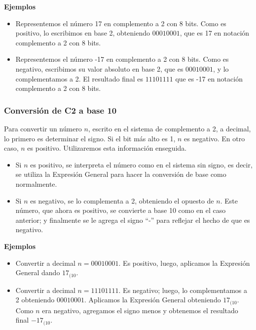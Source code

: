 \documentclass[spanish,A4,]{article}
\begin{document}
\textbf{Ejemplos}

\begin{itemize}
\itemsep1pt\parskip0pt
\item
  Representemos el número 17 en complemento a 2 con 8 bits. Como es
  positivo, lo escribimos en base 2, obteniendo $00010001$, que es 17 en
  notación complemento a 2 con 8 bits.
\item
  Representemos el número -17 en complemento a 2 con 8 bits. Como es
  negativo, escribimos su valor absoluto en base 2, que es $00010001$, y
  lo complementamos a 2. El resultado final es $11101111$ que es -17 en
  notación complemento a 2 con 8 bits.
\end{itemize}

\subsubsection{Conversión de C2 a base
10}\label{conversiuxf3n-de-c2-a-base-10}

Para convertir un número $n$, escrito en el sistema de complemento a 2,
a decimal, lo primero es determinar el signo. Si el bit más alto es 1,
$n$ es negativo. En otro caso, $n$ es positivo. Utilizaremos esta
información enseguida.

\begin{itemize}
\itemsep1pt\parskip0pt
\item
  Si $n$ es positivo, se interpreta el número como en el sistema sin
  signo, es decir, se utiliza la Expresión General para hacer la
  conversión de base como normalmente.
\item
  Si $n$ es negativo, se lo complementa a 2, obteniendo el opuesto de
  $n$. Este número, que ahora es positivo, se convierte a base 10 como
  en el caso anterior; y finalmente se le agrega el signo ``-'' para
  reflejar el hecho de que es negativo.
\end{itemize}

\textbf{Ejemplos}

\begin{itemize}
\itemsep1pt\parskip0pt
\item
  Convertir a decimal $n = 00010001$. Es positivo, luego, aplicamos la
  Expresión General dando $17_{(10}$.
\item
  Convertir a decimal $n = 11101111$. Es negativo; luego, lo
  complementamos a 2 obteniendo $00010001$. Aplicamos la Expresión
  General obteniendo $17_{(10}$. Como $n$ era negativo, agregamos el
  signo menos y obtenemos el resultado final $-17_{(10}$.
\end{itemize}
\end{document}
